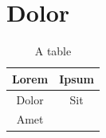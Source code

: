     \lipsum[4]

\section{Dolor}\label{sec:dolor}

    \lipsum[3]

    \begin{table}
        \centering
        \begin{tabular}{|c|c|}
            \hline
            \textbf{Lorem} & \textbf{Ipsum} \\
            \hline
            \hline
            Dolor & Sit \\
            \hline
            Amet &  \\
            \hline
        \end{tabular}
        \caption{A table}
        \label{tab:example}
    \end{table}

    \lipsum[4-5]
